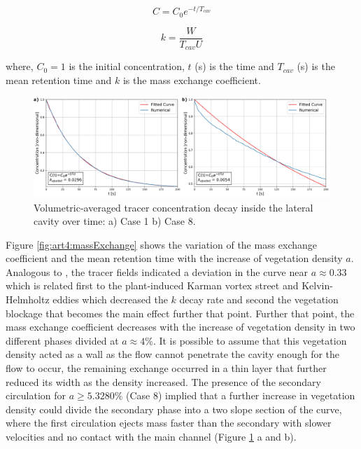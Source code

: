\begin{equation}
C=C_0 e^{-t/T_{cav}}
\label{eqn:art4:concentration}
\end{equation}

\begin{equation}
k=\frac{W}{T_{cav} U}
\label{eqn:art4:k}
\end{equation}

where, $C_0=1$ is the initial concentration, $t$ (s) is the time and $T_{cav}$ (s) is the mean retention time and $k$ is the mass exchange coefficient.

\begin{figure}[!htb]
\centering
\includegraphics[width=\linewidth]{../images/art4/massDecay.jpeg}
\caption{Volumetric-averaged tracer concentration decay inside the lateral cavity over time: a) Case 1 b) Case 8.}
\label{fig:art4:massConcentration}
\end{figure}

Figure \ref{fig:art4:massExchange} shows the variation of the mass exchange coefficient and the mean retention time with the increase of vegetation density $a$. Analogous to \textcite{xiang2019}, the tracer fields indicated a deviation in the curve near $a \approx 0.33$ which is related first to the plant-induced Karman vortex street and Kelvin-Helmholtz eddies \cite{Nepf2012} which decreased the $k$ decay rate and second the vegetation blockage that becomes the main effect further that point. Further that point, the mass exchange coefficient decreases with the increase of vegetation density in two different phases divided at $a \approx 4$\%. It is possible to assume that this vegetation density acted as a wall as the flow cannot penetrate the cavity enough for the flow to occur, the remaining exchange occurred in a thin layer that further reduced its width as the density increased. The presence of the secondary circulation for $a \geq 5.3280$\% (Case 8) implied that a further increase in vegetation density could divide the secondary phase into a two slope section of the curve, where the first circulation ejects mass faster than the secondary with slower velocities and no contact with the main channel \cite{deOliveira2020} (Figure \ref{fig:art4:massConcentration} a and b).

